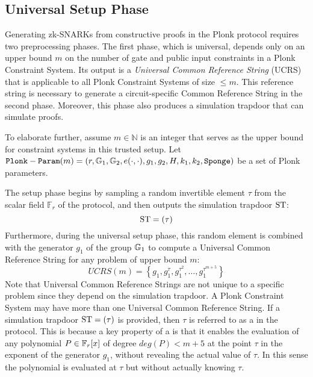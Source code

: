 \subsection{Universal Setup Phase}
Generating zk-SNARKs from constructive proofs in the Plonk protocol requires two preprocessing phases. The first phase, which is universal, depends only on an upper bound $m$ on the number of gate and public input constraints in a Plonk Constraint System. Its output is a \textit{Universal Common Reference String} (UCRS) that is applicable to all Plonk Constraint Systems of size $\leq m$. This reference string is necessary to generate a circuit-specific Common Reference String in the second phase. Moreover, this phase also produces a simulation trapdoor that can simulate proofs.

To elaborate further, assume $m \in \mathbb{N}$ is an integer that serves as the upper bound for constraint systems in this trusted setup. Let $\mathtt{Plonk-Param}(m)=(r, \mathbb{G}_1, \mathbb{G}_2, e(\cdot,\cdot), g_1,g_2, H, k_1,k_2, \mathtt{Sponge})$ be a set of Plonk parameters.

The setup phase begins by sampling a random invertible element $\tau$ from the scalar field $\mathbb{F}_r$ of the protocol, and then outputs the simulation trapdoor $\mathbf{\mathrm{ST}}$:
\begin{equation}
\label{def:groth16-trapdoor}
\mathrm{ST} = (\tau)
\end{equation}
Furthermore, during the universal setup phase, this random element is combined with the generator $g_1$ of the group $\mathbb{G}_1$ to compute a Universal Common Reference String for any problem of upper bound $m$:
\begin{equation}
\label{def:plonk-ucrs}
UCRS(m) = \left\{g_1, g_1^{\tau}, g_1^{\tau^2},\ldots, g_1^{\tau^{m+5}}\right\}
\end{equation}
Note that Universal Common Reference Strings are not unique to a specific problem since they depend on the simulation trapdoor. A Plonk Constraint System may have more than one Universal Common Reference String. If a simulation trapdoor $\mathrm{ST} = (\tau)$ is provided, then $\tau$ is referred to as a  in the protocol. This is because a key property of a  is that it enables the evaluation of any polynomial $P\in \mathbb{F}_r[x]$ of degree $deg(P)<m+5$ at the point $\tau$ in the exponent of the generator $g_1$, without revealing the actual value of $\tau$. In this sense the polynomial is evaluated at $\tau$ but without actually knowing $\tau$.

